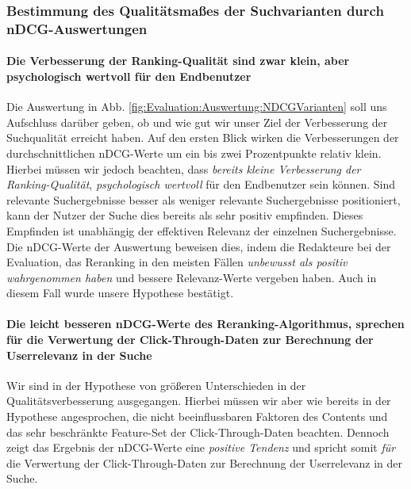 \subsubsection{Bestimmung des Qualitätsmaßes der Suchvarianten durch nDCG-Auswertungen}
\label{sec:Evaluation:Auswertung:Diskussion:nDCG}

\paragraph{Die Verbesserung der Ranking-Qualität sind zwar klein, aber psychologisch wertvoll für den Endbenutzer} 
Die Auswertung in Abb. \ref{fig:Evaluation:Auswertung:NDCGVarianten} soll uns Aufschluss darüber geben, ob und wie gut wir unser Ziel der Verbesserung der Suchqualität erreicht haben. Auf den ersten Blick wirken die Verbesserungen der durchschnittlichen nDCG-Werte um ein bis zwei Prozentpunkte relativ klein. Hierbei müssen wir jedoch beachten, dass \textit{bereits kleine Verbesserung der Ranking-Qualität}, \textit{psychologisch wertvoll} für den Endbenutzer sein können. Sind relevante Suchergebnisse besser als weniger relevante Suchergebnisse positioniert, kann der Nutzer der Suche dies bereits als sehr positiv empfinden. Dieses Empfinden ist unabhängig der effektiven Relevanz der einzelnen Suchergebnisse. Die nDCG-Werte der Auswertung beweisen dies, indem die Redakteure bei der Evaluation, das Reranking in den meisten Fällen \textit{unbewusst als positiv wahrgenommen haben} und bessere Relevanz-Werte vergeben haben. Auch in diesem Fall wurde unsere Hypothese bestätigt. 

\pagebreak

\paragraph{Die leicht besseren nDCG-Werte des Reranking-Algorithmus, sprechen für die Verwertung der Click-Through-Daten zur Berechnung der Userrelevanz in der Suche} 
Wir sind in der Hypothese von größeren Unterschieden in der Qualitätsverbesserung ausgegangen. Hierbei müssen wir aber wie bereits in der Hypothese angesprochen, die nicht beeinflussbaren Faktoren des Contents und das sehr beschränkte Feature-Set der Click-Through-Daten beachten. Dennoch zeigt das Ergebnis der nDCG-Werte eine \textit{positive Tendenz} und spricht somit \textit{für} die Verwertung der Click-Through-Daten zur Berechnung der Userrelevanz in der Suche.  

